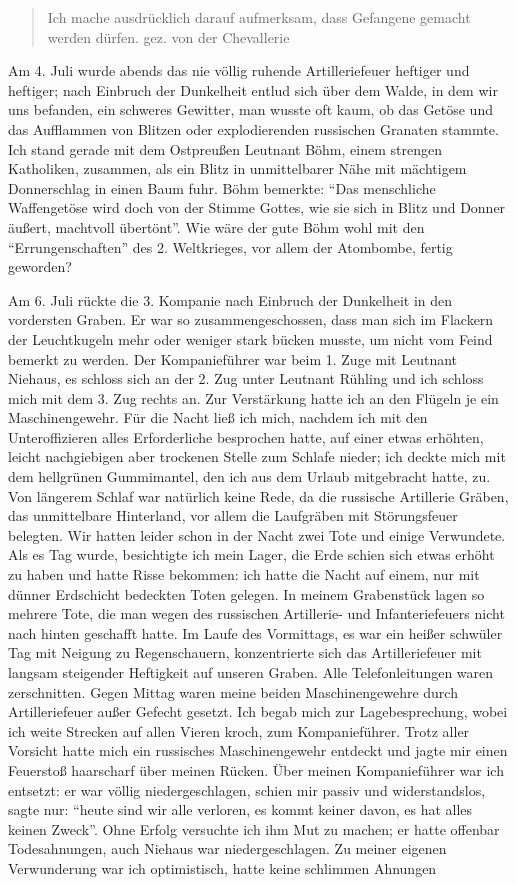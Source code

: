 \documentclass[a5paper,pagesize,10pt,twoside=true]{scrbook}
\begin{document}
\begin{quote}
Ich mache ausdrücklich darauf aufmerksam, dass Gefangene gemacht werden dürfen.
\raggedleft gez. von der Chevallerie
\end{quote}

Am 4. Juli wurde abends das nie völlig ruhende Artilleriefeuer heftiger und heftiger; nach Einbruch der Dunkelheit entlud sich über dem Walde, in dem wir uns befanden, ein schweres Gewitter, man wusste oft kaum, ob das Getöse und das Aufflammen von Blitzen oder explodierenden russischen Granaten stammte. Ich stand gerade mit dem Ostpreußen Leutnant Böhm, einem strengen Katholiken, zusammen, als ein Blitz in unmittelbarer Nähe mit mächtigem Donnerschlag in einen Baum fuhr. Böhm bemerkte: \enquote{Das menschliche Waffengetöse wird doch von der Stimme Gottes, wie sie sich in Blitz und Donner äußert, machtvoll übertönt}. Wie wäre der gute Böhm wohl mit den \enquote{Errungenschaften} des 2. Weltkrieges, vor allem der Atombombe, fertig geworden?

Am 6. Juli rückte die 3. Kompanie nach Einbruch der Dunkelheit in den vordersten Graben. Er war so zusammengeschossen, dass man sich im Flackern der Leuchtkugeln mehr oder weniger stark bücken musste, um nicht vom Feind bemerkt zu werden. Der Kompanieführer war beim 1. Zuge mit Leutnant Niehaus, es schloss sich an der 2. Zug unter Leutnant Rühling und ich schloss mich mit dem 3. Zug rechts an. Zur Verstärkung hatte ich an den Flügeln je ein Maschinengewehr. Für die Nacht ließ ich mich, nachdem ich mit den Unteroffizieren alles Erforderliche besprochen hatte, auf einer etwas erhöhten, leicht nachgiebigen aber trockenen Stelle zum Schlafe nieder; ich deckte mich mit dem hellgrünen Gummimantel, den ich aus dem Urlaub mitgebracht hatte, zu. Von längerem Schlaf war natürlich keine Rede, da die russische Artillerie Gräben, das unmittelbare Hinterland, vor allem die Laufgräben mit Störungsfeuer belegten. Wir hatten leider schon in der Nacht zwei Tote und einige Verwundete. Als es Tag wurde, besichtigte ich mein Lager, die Erde schien sich etwas erhöht zu haben und hatte Risse bekommen: ich hatte die Nacht auf einem, nur mit dünner Erdschicht bedeckten Toten gelegen. In meinem Grabenstück lagen so mehrere Tote, die man wegen des russischen Artillerie- und Infanteriefeuers nicht nach hinten geschafft hatte. Im Laufe des Vormittags, es war ein heißer schwüler Tag mit Neigung zu Regenschauern, konzentrierte sich das Artilleriefeuer mit langsam steigender Heftigkeit auf unseren Graben. Alle Telefonleitungen waren zerschnitten. Gegen Mittag waren meine beiden Maschinengewehre durch Artilleriefeuer außer Gefecht gesetzt. Ich begab mich zur Lagebesprechung, wobei ich weite Strecken auf allen Vieren kroch, zum Kompanieführer. Trotz aller Vorsicht hatte mich ein russisches Maschinengewehr entdeckt und jagte mir einen Feuerstoß haarscharf über meinen Rücken. Über meinen Kompanieführer war ich entsetzt: er war völlig niedergeschlagen, schien mir passiv und widerstandslos, sagte nur: \enquote{heute sind wir alle verloren, es kommt keiner davon, es hat alles keinen Zweck}. Ohne Erfolg versuchte ich ihm Mut zu machen; er hatte offenbar Todesahnungen, auch Niehaus war niedergeschlagen. Zu meiner eigenen Verwunderung war ich optimistisch, hatte keine schlimmen Ahnungen
\end{document}
